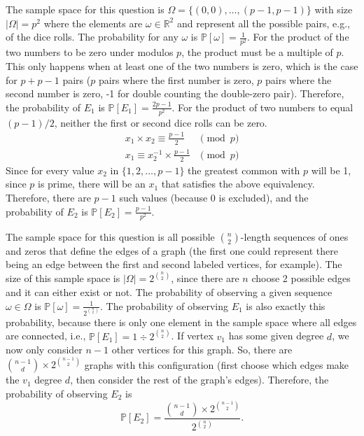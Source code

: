 \documentclass[11pt]{article}
\begin{document}
\begin{solution}

\begin{Parts}
\Part The sample space for this question is $\Omega = \{ (0, 0), \dots, (p-1, p-1)
\}$ with size $|\Omega| = p^2$ where the elements are $\omega \in \mathbb{R}^2$
and represent all the possible pairs, e.g., of the dice rolls. The probability for
any $\omega$ is $\mathbb{P}[\omega] = \frac{1}{p^2}$. For the product of the two
numbers to be zero under modulos $p$, the product must be a multiple of $p$. 
This only happens when at least one of the two numbers is zero, which is the case
for $p + p - 1$ pairs ($p$ pairs where the first number is zero, $p$ pairs where
the second number is zero, -1 for double counting the double-zero pair). Therefore,
the probability of $E_1$ is $\mathbb{P}[E_1] = \frac{2p-1}{p^2}$. For the product
of two numbers to equal $(p-1)/2$, neither the first or second dice rolls can be
zero. 
\[
    \begin{split}
        x_1 \times x_2 \equiv \frac{p-1}{2} &\pmod{p} \\
        x_1 \equiv x_2^{-1} \times \frac{p-1}{2} &\pmod{p}
    \end{split}
\]
Since for every value $x_2$ in $\{ 1, 2, \dots, p-1 \}$ the greatest common
with $p$ will be 1, since $p$ is prime, there will be an $x_1$ that
satisfies the above equivalency. Therefore, there are $p-1$ such values (because
0 is excluded), and the probability of $E_2$ is $\mathbb{P}[E_2] = \frac{p-1}{p^2}$.

\Part The sample space for this question is all possible $\binom{n}{2}$-length 
sequences of ones and zeros that define the edges of a graph (the first one
could represent there being an edge between the first and second labeled vertices,
for example). The size of this sample space is $|\Omega| = 2^{\binom{n}{2}}$, 
since there are $n$ choose 2 possible edges and it can either exist or not. The
probability of observing a given sequence $\omega \in \Omega$ is $\mathbb{P}[\omega]=
\frac{1}{2^{\binom{n}{2}}}$. The probability of observing $E_1$ is also exactly
this probability, because there is only one element in the sample space where
all edges are connected, i.e., $\mathbb{P}[E_1] = 1 \div 2^{\binom{n}{2}}$. If
vertex $v_1$ has some given degree $d$, we now only consider $n-1$ other vertices
for this graph. So, there are $\binom{n-1}{d} \times 2^{\binom{n-1}{2}}$ graphs 
with this configuration (first choose which edges make the $v_1$ degree $d$,
then consider the rest of the graph's edges). Therefore, the probability of 
observing $E_2$ is 
\[
    \mathbb{P}[E_2]=\frac{\binom{n-1}{d} \times 2^{\binom{n-1}{2}}}{2^{\binom{n}{2}}}.
\]


\end{Parts}
\end{solution}
\end{document}
